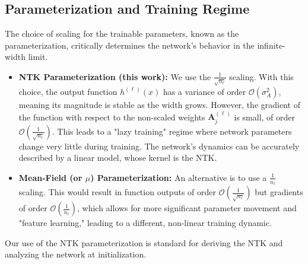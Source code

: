 \documentclass[a4paper]{article}
\begin{document}
\subsection{Parameterization and Training Regime}
The choice of scaling for the trainable parameters, known as the parameterization, critically determines the network's behavior in the infinite-width limit.
\begin{itemize}
    \item \textbf{NTK Parameterization (this work):} We use the $\frac{1}{\sqrt{n_\ell}}$ scaling. With this choice, the output function $h^{(\ell)}(x)$ has a variance of order $\mathcal{O}(\sigma_A^2)$, meaning its magnitude is stable as the width grows. However, the gradient of the function with respect to the non-scaled weights $\bm{A}_j^{(\ell)}$ is small, of order $\mathcal{O}(\frac{1}{\sqrt{n_\ell}})$. This leads to a "lazy training" regime where network parameters change very little during training. The network's dynamics can be accurately described by a linear model, whose kernel is the NTK.
    \item \textbf{Mean-Field (or \(\mu\)) Parameterization:} An alternative is to use a $\frac{1}{n_\ell}$ scaling. This would result in function outputs of order $\mathcal{O}(\frac{1}{\sqrt{n_\ell}})$ but gradients of order $\mathcal{O}(\frac{1}{n_\ell})$, which allows for more significant parameter movement and "feature learning," leading to a different, non-linear training dynamic.
\end{itemize}
Our use of the NTK parameterization is standard for deriving the NTK and analyzing the network at initialization.
\end{document}
